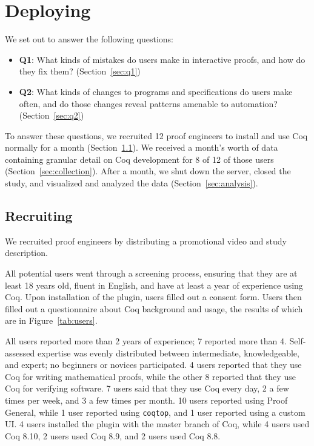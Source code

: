 \section{Deploying \toolname}
\label{sec:deployment}

We set out to answer the following questions:

\begin{itemize}
\item \textbf{Q1}: What kinds of mistakes do users make in interactive proofs, and how do they fix them? (Section~\ref{sec:q1})
\item \textbf{Q2}: What kinds of changes to programs and specifications do users
make often, and do those changes reveal patterns amenable to automation? (Section~\ref{sec:q2})
\end{itemize}
To answer these questions, we recruited 12 proof
engineers to install \toolname and use Coq normally for
a month (Section~\ref{sec:recruiting}).
We received a month's worth of data containing granular detail on
Coq development for 8 of 12 of those users
(Section~\ref{sec:collection}).
After a month, we shut down the server, closed the study,
and visualized and analyzed the data (Section~\ref{sec:analysis}).

\subsection{Recruiting}
\label{sec:recruiting}

We recruited proof engineers by distributing a promotional video
and study description.

All potential users went through a screening process, ensuring that they are
at least 18 years old, fluent in English, and have at least a year of experience using Coq.
Upon installation of the plugin, users filled out a consent form.
Users then filled out a questionnaire about Coq background and usage,
the results of which are in Figure~\ref{tab:users}.

All users reported more than 2 years of experience;
7 reported more than 4.
Self-assessed expertise was evenly distributed between intermediate,
knowledgeable, and expert; no beginners or novices participated.
4 users reported that they use Coq for writing mathematical proofs,
while the other 8 reported that they use Coq for verifying software.
7 users said that they use Coq every day, 2 a few times per week,
and 3 a few times per month.
10 users reported using Proof General, while 1 user reported using
\lstinline{coqtop}, and 1 user reported using a custom UI.
4 users installed the plugin with the master branch of Coq,
while 4 users used Coq 8.10, 2 users used Coq 8.9,
and 2 users used Coq 8.8.

